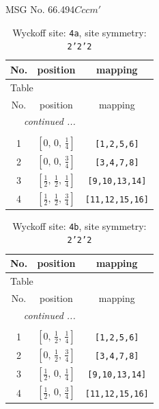 \documentclass[fleqn,8pt]{jsarticle}
\begin{document}
\setcounter{MaxMatrixCols}{32}

\renewcommand{\tablename}{Table~}
\renewcommand{\figurename}{Figure~}
\begin{center}
\LARGE
MSG No. 66.494\quad$Cccm'$
\end{center}
\renewcommand{\arraystretch}{1.2}
\begin{longtable}{ccc}
\caption{Wyckoff site: {\tt 4a}, site symmetry: {\tt 2'2'2}}
 \\
 \hline \hline
No. & position & mapping \\ \hline \endfirsthead

\multicolumn{2}{l}{\tablename\ \thetable{}} \\
 \hline \hline
No. & position & mapping \\ \hline \endhead

 \hline \hline
\multicolumn{2}{r}{\footnotesize\it continued ...} \\ \endfoot

 \hline \hline
\multicolumn{2}{r}{} \\ \endlastfoot

1 & $\left[ 0,\, 0,\, \frac{1}{4} \right]$ & {\tt [1,2,5,6]} \\ \hline
2 & $\left[ 0,\, 0,\, \frac{3}{4} \right]$ & {\tt [3,4,7,8]} \\ \hline
3 & $\left[ \frac{1}{2},\, \frac{1}{2},\, \frac{1}{4} \right]$ & {\tt [9,10,13,14]} \\ \hline
4 & $\left[ \frac{1}{2},\, \frac{1}{2},\, \frac{3}{4} \right]$ & {\tt [11,12,15,16]} \\
\end{longtable}
\renewcommand{\arraystretch}{1.2}
\begin{longtable}{ccc}
\caption{Wyckoff site: {\tt 4b}, site symmetry: {\tt 2'2'2}}
 \\
 \hline \hline
No. & position & mapping \\ \hline \endfirsthead

\multicolumn{2}{l}{\tablename\ \thetable{}} \\
 \hline \hline
No. & position & mapping \\ \hline \endhead

 \hline \hline
\multicolumn{2}{r}{\footnotesize\it continued ...} \\ \endfoot

 \hline \hline
\multicolumn{2}{r}{} \\ \endlastfoot

1 & $\left[ 0,\, \frac{1}{2},\, \frac{1}{4} \right]$ & {\tt [1,2,5,6]} \\ \hline
2 & $\left[ 0,\, \frac{1}{2},\, \frac{3}{4} \right]$ & {\tt [3,4,7,8]} \\ \hline
3 & $\left[ \frac{1}{2},\, 0,\, \frac{1}{4} \right]$ & {\tt [9,10,13,14]} \\ \hline
4 & $\left[ \frac{1}{2},\, 0,\, \frac{3}{4} \right]$ & {\tt [11,12,15,16]} \\
\end{longtable}
\end{document}
